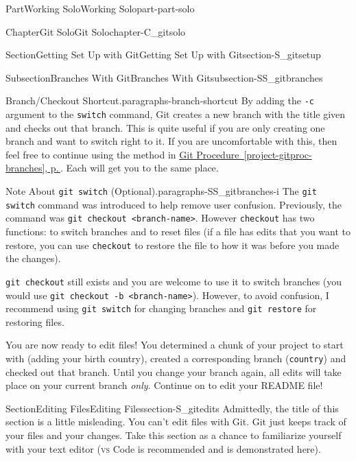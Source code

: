 \documentclass[twoside,10pt,]{book}
\newcommand{\xreffont}{\relax}
\newcommand{\mono}[1]{\texttt{#1}}
\newcommand{\initialism}[1]{\textsc{\MakeLowercase{#1}}}
\begin{document}
\begin{partptx}{Part}{Working Solo}{}{Working Solo}{}{}{part-part-solo}
\begin{chapterptx}{Chapter}{Git Solo}{}{Git Solo}{}{}{chapter-C_gitsolo}
\begin{sectionptx}{Section}{Getting Set Up with Git}{}{Getting Set Up with Git}{}{}{section-S_gitsetup}
\begin{subsectionptx}{Subsection}{Branches With Git}{}{Branches With Git}{}{}{subsection-SS_gitbranches}
\begin{paragraphs}{Branch\slash{}Checkout Shortcut.}{paragraphs-branch-shortcut}
By adding the \mono{-c} argument to the \mono{switch} command, Git creates a new branch with the title given and checks out that branch. This is quite useful if you are only creating one branch and want to switch right to it. If you are uncomfortable with this, then feel free to continue using the method in \hyperref[project-gitproc-branches]{Git Procedure~{\xreffont\ref{project-gitproc-branches}}, p.\,\pageref{project-gitproc-branches}}. Each will get you to the same place.%
\end{paragraphs}%
\begin{paragraphs}{Note About \mono{git switch} (Optional).}{paragraphs-SS_gitbranches-i}%
The \mono{git switch} command was introduced to help remove user confusion. Previously, the command was \mono{git checkout <branch-name>}. However \mono{checkout} has two functions: to switch branches and to reset files (if a file has edits that you want to restore, you can use \mono{checkout} to restore the file to how it was before you made the changes).%
\par
\mono{git checkout} still exists and you are welcome to use it to switch branches (you would use \mono{git checkout -b <branch-name>}). However, to avoid confusion, I recommend using \mono{git switch} for changing branches and \mono{git restore} for restoring files.%
\end{paragraphs}%
\end{subsectionptx}
\begin{conclusion}{}%
You are now ready to edit files! You determined a chunk of your project to start with (adding your birth country), created a corresponding branch (\mono{country}) and checked out that branch. Until you change your branch again, all edits will take place on your current branch \emph{only}. Continue on to edit your README file!%
\end{conclusion}%
\end{sectionptx}
%
%
\typeout{************************************************}
\typeout{************************************************}
%
\begin{sectionptx}{Section}{Editing Files}{}{Editing Files}{}{}{section-S_gitedits}
%
%
%
Admittedly, the title of this section is a little misleading. You can't edit files with Git. Git just keeps track of your files and your changes. Take this section as a chance to familiarize yourself with your text editor (\initialism{VS} Code is recommended and is demonstrated here).%
\par

\end{sectionptx}
\end{chapterptx}
\end{partptx}
\end{document}
